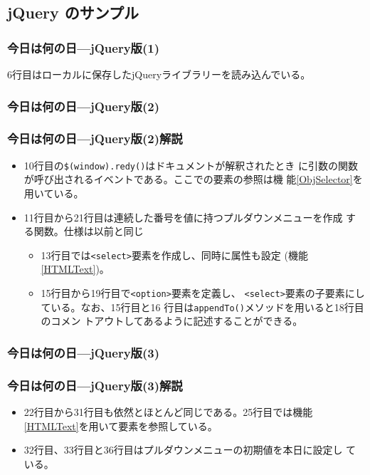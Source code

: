 \subsection{jQuery のサンプル}
\begin{frame}[containsverbatim]
 \frametitle{今日は何の日---jQuery版(1)}
 6行目はローカルに保存したjQueryライブラリーを読み込んでいる。
\end{frame}
\begin{frame}[containsverbatim]
\frametitle{今日は何の日---jQuery版(2)}
\end{frame}
\begin{frame}[containsverbatim]
\frametitle{今日は何の日---jQuery版(2)解説}
 \begin{itemize}
  \item 10行目の\texttt{\$(window).redy()}はドキュメントが解釈されたとき
	に引数の関数が呼び出されるイベントである。ここでの要素の参照は機
	能\ref{ObjSelector}を用いている。
  \item 11行目から21行目は連続した番号を値に持つプルダウンメニューを作成
	する関数。仕様は以前と同じ
	\begin{itemize}
	 \item 13行目では\texttt{<select>}要素を作成し、同時に属性も設定
	       (機能\ref{HTMLText})。
	 \item 15行目から19行目で\texttt{<option>}要素を定義し、
	       \texttt{<select>}要素の子要素にしている。なお、15行目と16
	       行目は\texttt{appendTo()}メソッドを用いると18行目のコメン
	       トアウトしてあるように記述することができる。
	\end{itemize}
 \end{itemize}
\end{frame}
\begin{frame}[containsverbatim]
\frametitle{今日は何の日---jQuery版(3)}
 \end{frame}
\begin{frame}[containsverbatim]
 \frametitle{今日は何の日---jQuery版(3)解説}
 \begin{itemize}
   \item 22行目から31行目も依然とほとんど同じである。25行目では機能
	\ref{HTMLText}を用いて要素を参照している。
  \item 32行目、33行目と36行目はプルダウンメニューの初期値を本日に設定し
	ている。
  \end{itemize}
 \end{frame}
